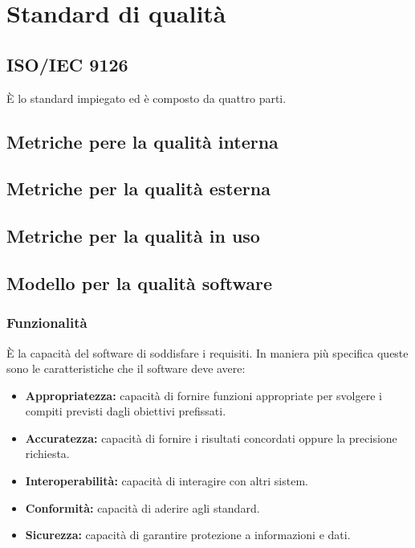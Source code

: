 \section{Standard di qualit\`a}
\subsection{ISO/IEC 9126}
\`E lo standard impiegato ed \`e composto da quattro parti.
\subsection{Metriche pere la qualit\`a interna}
\subsection{Metriche per la qualit\`a esterna}
\subsection{Metriche per la qualit\`a in uso}
\subsection{Modello per la qualit\`a software}
\subsubsection{Funzionalit\`a}
\`E la capacit\`a del software di soddisfare i requisiti. In maniera pi\`u specifica queste sono le caratteristiche che il software deve avere:
\begin{itemize}
    \item \textbf{Appropriatezza:} capacit\`a di fornire funzioni appropriate per svolgere i compiti previsti dagli obiettivi prefissati.
    \item \textbf{Accuratezza:} capacit\`a di fornire i risultati concordati oppure la precisione richiesta.
    \item \textbf{Interoperabilit\`a:} capacit\`a  di interagire con altri sistem.
    \item \textbf{Conformit\`a:} capacit\`a di aderire agli standard.
    \item \textbf{Sicurezza:} capacit\`a di garantire protezione a informazioni e dati.
\end{itemize}

